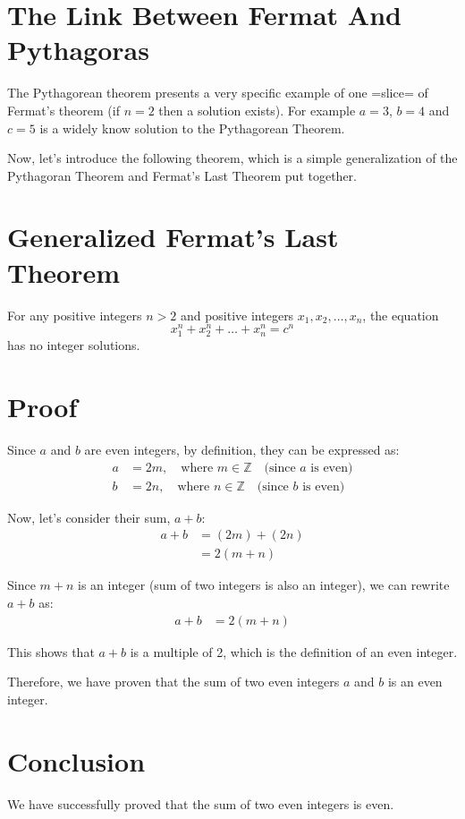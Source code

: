 \documentclass{article}
\begin{document}
\section{The Link Between Fermat And Pythagoras}
The Pythagorean theorem presents a very specific example of one =slice= of Fermat's theorem (if $n = 2$ then a solution exists). For example $a = 3$, $b = 4$ and $c = 5$ is a widely know solution to the Pythagorean Theorem.

Now, let's introduce the following theorem, which is a simple generalization of the Pythagoran Theorem and Fermat's Last Theorem put together.

\section*{Generalized Fermat's Last Theorem}
For any positive integers $n > 2$ and positive integers $x_1, x_2, \ldots, x_n$, the equation
\begin{equation}
x_1^n + x_2^n + \ldots + x_n^n = c^n
\end{equation}
has no integer solutions.

\section{Proof}
Since $a$ and $b$ are even integers, by definition, they can be expressed as:
\begin{align*}
a &= 2m, \quad \text{where } m \in \mathbb{Z} \quad \text{(since $a$ is even)} \\
b &= 2n, \quad \text{where } n \in \mathbb{Z} \quad \text{(since $b$ is even)}
\end{align*}

Now, let's consider their sum, $a + b$:
\begin{align*}
a + b &= (2m) + (2n) \\
&= 2(m + n)
\end{align*}

Since $m + n$ is an integer (sum of two integers is also an integer), we can rewrite $a + b$ as:
\begin{align*}
a + b &= 2(m + n)
\end{align*}

This shows that $a + b$ is a multiple of 2, which is the definition of an even integer.

Therefore, we have proven that the sum of two even integers $a$ and $b$ is an even integer.

\section{Conclusion}
We have successfully proved that the sum of two even integers is even.
\end{document}
